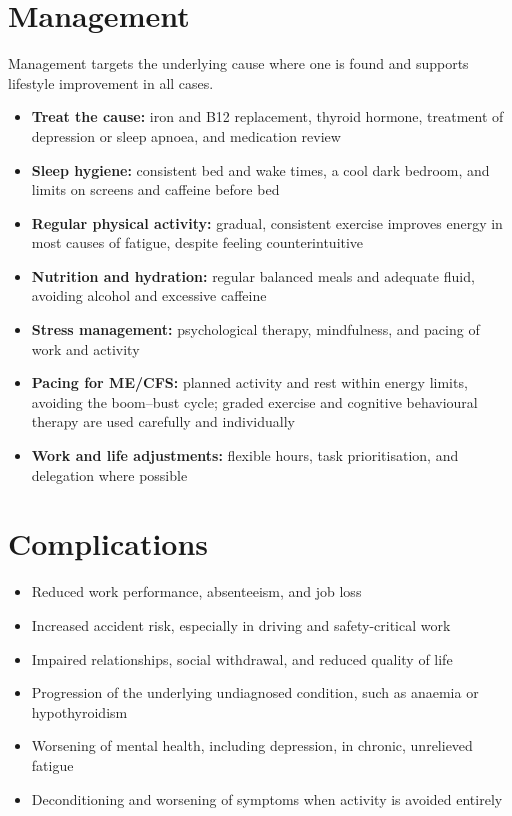 \section*{Management}
Management targets the underlying cause where one is found and supports lifestyle improvement in all cases.
\begin{itemize}
    \item \textbf{Treat the cause:} iron and B12 replacement, thyroid hormone, treatment of depression or sleep apnoea, and medication review
    \item \textbf{Sleep hygiene:} consistent bed and wake times, a cool dark bedroom, and limits on screens and caffeine before bed
    \item \textbf{Regular physical activity:} gradual, consistent exercise improves energy in most causes of fatigue, despite feeling counterintuitive
    \item \textbf{Nutrition and hydration:} regular balanced meals and adequate fluid, avoiding alcohol and excessive caffeine
    \item \textbf{Stress management:} psychological therapy, mindfulness, and pacing of work and activity
    \item \textbf{Pacing for ME/CFS:} planned activity and rest within energy limits, avoiding the boom--bust cycle; graded exercise and cognitive behavioural therapy are used carefully and individually
    \item \textbf{Work and life adjustments:} flexible hours, task prioritisation, and delegation where possible
\end{itemize}

\section*{Complications}
\begin{itemize}
    \item Reduced work performance, absenteeism, and job loss
    \item Increased accident risk, especially in driving and safety-critical work
    \item Impaired relationships, social withdrawal, and reduced quality of life
    \item Progression of the underlying undiagnosed condition, such as anaemia or hypothyroidism
    \item Worsening of mental health, including depression, in chronic, unrelieved fatigue
    \item Deconditioning and worsening of symptoms when activity is avoided entirely
\end{itemize}

